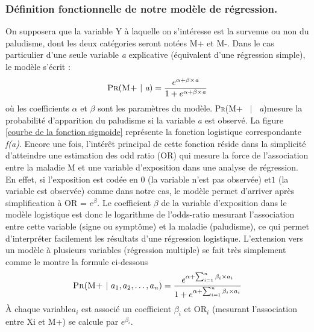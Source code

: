 \subsubsection{Définition fonctionnelle de notre modèle de régression.}
On supposera que la variable  \textsc{Y} à laquelle on s'intéresse est la survenue ou non du paludisme, dont les deux catégories seront notées \textsc{M+} et \textsc{M-}.
Dans le cas particulier d'une seule variable \emph{a} explicative (équivalent d'une régression simple), le modèle s'écrit :
\begin{equation}
\textsc{Pr}(\textsc{M+} ~|~ \emph{a}) = \frac{e^{\alpha + \beta\times \emph{a} }}{1 + e^{\alpha + \beta\times \emph{a} }}
\label{simple_regression}
\end{equation}
où les coefficients $\alpha$ et $\beta$ sont les paramètres du modèle.
\textsc{Pr}(\textsc{M+} ~$|$~ \emph{a})mesure la probabilité d’apparition du paludisme si la variable \emph{a} est observé. La figure \ref{courbe de la fonction sigmoide} représente la fonction logistique correspondante \emph{f(a)}. Encore une fois, l’intérêt principal de cette fonction réside dans la simplicité d’atteindre une estimation des odd ratio (OR) qui mesure la force de l'association entre la maladie \textsc{M} et une variable d'exposition dans une analyse de régression. En effet, si l'exposition est codée en $0$ (la variable n’est pas observée) et$1$ (la variable est observée) comme dans notre cas, le modèle permet d'arriver après simplification à           OR = $e^{\beta}$. Le coefficient $\beta$ de la variable d'exposition dans le modèle logistique est donc le logarithme de l'odds-ratio mesurant l'association entre cette variable (signe ou symptôme) et la maladie (paludisme), ce qui permet d'interpréter facilement les résultats d'une régression logistique.
L'extension vers un modèle à plusieurs variables (régression multiple) se fait très simplement comme le montre la formule ci-dessous
\begin{equation}
\textsc{Pr}(\textsc{M+} ~|~ \emph{$a_1$},\emph{$a_2$}, \ldots, \emph{$a_n$}) = \frac{e^{\alpha + \sum_{i=1}^{n} \beta_i \times \emph{$a_i$} }}{1 + e^{\alpha + \sum_{i=1}^{n} \beta_i \times \emph{$a_i$} }}
\label{multiple_regression}
\end{equation} 
À chaque variable\emph{$a_i$} est associé un coefficient $\beta_i$ et OR$_i$ (mesurant l'association entre Xi et M+) se calcule par  $e^{\beta_i}$.
